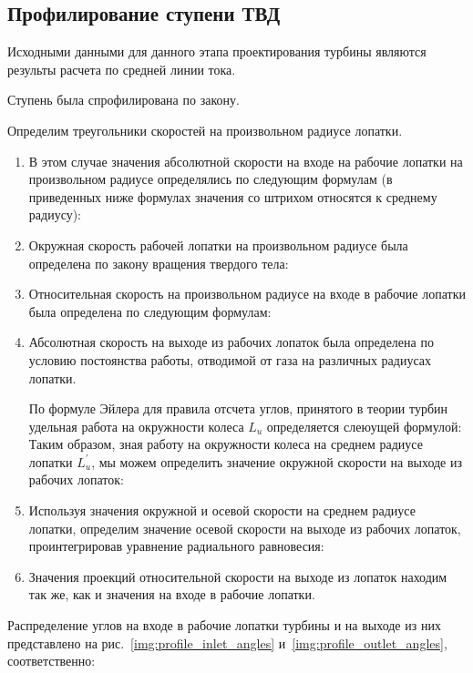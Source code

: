 \subsection{Профилирование ступени ТВД}
Исходными данными для данного этапа проектирования турбины являются результы расчета по средней линии тока.

Ступень была спрофилирована по закону.

Определим треугольники скоростей на произвольном радиусе лопатки.

\begin{enumerate}

	\item В этом случае значения абсолютной скорости на входе на рабочие лопатки на произвольном радиусе определялись по следующим формулам (в приведенных ниже формулах значения со штрихом относятся к среднему радиусу):
	\item Окружная скорость рабочей лопатки на произвольном радиусе была определена по закону вращения твердого тела:
	\item Относительная скорость на произвольном радиусе на входе в рабочие лопатки была определена по следующим формулам:
	\item Абсолютная скорость на выходе из рабочих лопаток была определена по условию постоянства работы, отводимой от газа на различных радиусах лопатки.

	По формуле Эйлера для правила отсчета углов, принятого в теории турбин удельная работа на окружности колеса $L_u$ определяется слеюущей формулой:
	Таким образом, зная работу на окружности колеса на среднем радиусе лопатки $L_u^\prime$, мы можем определить значение окружной скорости на выходе из рабочих лопаток:
	\item Используя значения окружной и осевой скорости на среднем радиусе лопатки, определим значение осевой скорости на выходе из рабочих лопаток, проинтегрировав уравнение радиального равновесия:
	\item Значения проекций относительной скорости на выходе из лопаток находим так же, как и значения на входе в рабочие лопатки.

\end{enumerate}
Распределение углов на входе в рабочие лопатки турбины и на выходе из них представлено на рис.~\ref{img:profile_inlet_angles}
и~\ref{img:profile_outlet_angles}, соответственно:
	